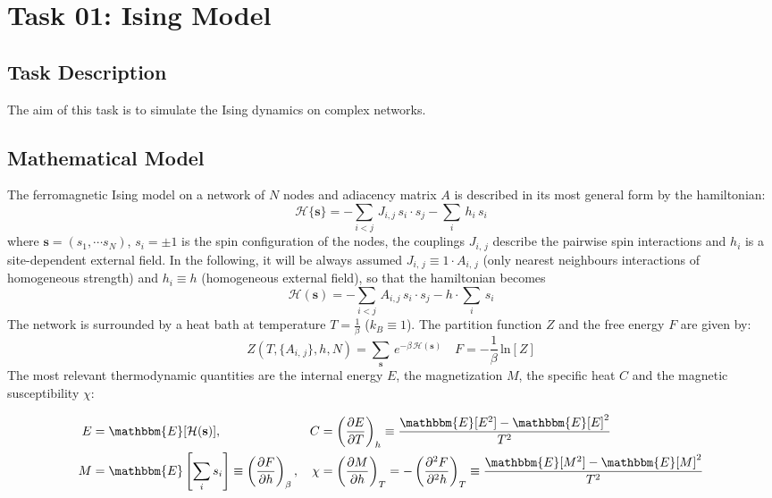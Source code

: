 \chapter{Task 01: Ising Model}
\section{Task Description}
The aim of this task is to simulate the Ising dynamics on complex networks. 
\section{Mathematical Model}
The ferromagnetic Ising model on a network of $N$ nodes and adiacency matrix $A$ is described in its most general form by the hamiltonian:
\begin{equation*}
    \mathcal{H}\{\mathbf{s}\} = - \sum_{i < j}\, J_{i,j}\,s_i\cdot s_j - \sum_{i}\, h_i\,s_i
\end{equation*}
where $\mathbf{s} = (s_1, \cdots s_N)$, $s_i = \pm 1$ is the spin configuration of the nodes, the couplings $J_{i,\,j}$ describe the pairwise spin interactions and $h_i$ is a site-dependent external field.
In the following, it will be always assumed $J_{i,\,j} \equiv 1\cdot A_{i,\,j}$ (only nearest neighbours interactions of homogeneous strength) and $h_i \equiv h$ (homogeneous external field), so that the hamiltonian becomes
\begin{equation}
        \mathcal{H}(\mathbf{s}) = - \sum_{i < j}\, A_{i,j}\,s_i\cdot s_j - h\cdot \sum_{i}\,s_i
\end{equation}
The network is surrounded by a heat bath at temperature $T = \frac{1}{\beta} $ ($k_B \equiv 1$). The partition function $Z$ and the free energy $F$ are given by:
\begin{equation*}
    Z\left(T, \{A_{i,\,j}\}, h, N\right) = \sum_{\mathbf{s}}\, e^{-\beta\, \mathcal{H}(\mathbf{s})} \quad F = -\frac{1}{\beta}\, \text{ln}[Z]
\end{equation*}
The most relevant thermodynamic quantities are the internal energy $E$, the magnetization $M$, the specific heat $C$ and the magnetic susceptibility $\chi$:

\begin{align*}
E &= \mathbbm{E}[\mathcal{H}(\mathbf{s})], &
C &= \left( \frac{\partial E}{\partial T} \right)_{h} \equiv \frac{\mathbbm{E}[E^2] - \mathbbm{E}[E]^2}{T^2} \\
M &= \mathbbm{E}\left[\sum_{i} s_i \right] \equiv \left( \frac{\partial F}{\partial h} \right)_{\beta}, &
\chi &= \left( \frac{\partial M}{\partial h} \right)_{T} = -\left( \frac{\partial^2 F}{\partial^2 h} \right)_{T} \equiv \frac{\mathbbm{E}[M^2] - \mathbbm{E}[M]^2}{T^2}
\end{align*}


